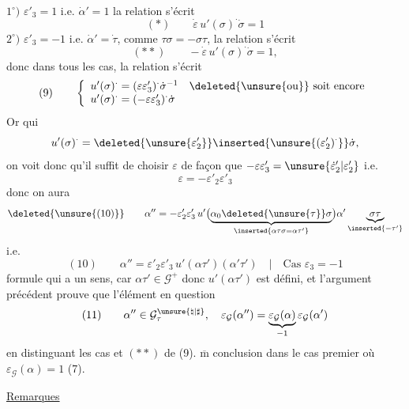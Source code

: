 $1^\circ)$ \quad $\varepsilon'_3=1$ i.e. $\dot{\alpha}'=1$
la relation s'écrit
\[
(*)\qquad \dot{\varepsilon}\,u'(\sigma)^{\cdot}\dot{\sigma}=1
\]
$2^\circ)$ \quad $\varepsilon'_3=-1$ i.e. $\dot{\alpha}'=\dot{\tau}$,
comme $\tau\sigma=-\sigma\tau$, la relation s'écrit
\[
(**)\qquad -\dot{\varepsilon}\,u'(\sigma)^{\cdot}\dot{\sigma}=1,
\]
donc dans tous les cas, la relation s'écrit
\[
(9)\qquad
\left\{
\begin{array}{l}
u'(\sigma)^{\cdot}=(\varepsilon\varepsilon'_3)^{\cdot}
\dot{\sigma}^{-1}
\quad\deleted{\unsure{\text{ou}}}\ \text{soit encore}\\
u'(\sigma)^{\cdot}=(-\varepsilon\varepsilon'_3)^{\cdot}\dot{\sigma}
\end{array}
\right.
\]
Or 
qui 
\[
u'(\sigma)^{\cdot}
=\deleted{\unsure{\varepsilon_2'}}
\inserted{\unsure{(\varepsilon'_2)^{\cdot}}}\dot{\sigma},
\]
on voit donc qu'il suffit de choisir $\varepsilon$ de façon que
$-\varepsilon\varepsilon'_3=\unsure{\dot{\varepsilon}'_2|\varepsilon'_2}$
i.e.
\[
\varepsilon=-\varepsilon'_2\varepsilon'_3
\]
donc on aura
\[
\deleted{\unsure{(10)}}\qquad
\alpha''=-\varepsilon'_2\varepsilon'_3\,
u'\bigl(
\underbrace{\alpha_0\deleted{\unsure{\tau}}\sigma}
_{\inserted{\alpha\tau\sigma=\alpha\tau'}}
\bigr)\alpha'\underbrace{\sigma\tau}_{\inserted{-\tau'}}
\]
i.e.
\[
(10)\qquad
\alpha''=\varepsilon'_2\varepsilon'_3\,u'(\alpha\tau')
(\alpha'\tau')
\quad\big|\quad\text{Cas }\varepsilon_3=-1
\]
formule qui a un sens, car $\alpha\tau'\in\mathcal{G}^{+}$ donc
$u'(\alpha\tau')$ est défini, et l'argument précédent prouve que
l'élément en question 
\[
(11)\qquad
\alpha''\in\mathcal{G}^{\unsure{\natural|\sharp}}_\tau,\quad
\varepsilon_{\mathcal{G}}(\alpha'')
=\underbrace{\varepsilon_{\mathcal{G}}(\alpha)}_{-1}
\varepsilon_{\mathcal{G}}(\alpha')
\]
en distinguant les cas \unsure{(*)} et $(**)$ de (9).
$\overline{\mathrm m}$ conclusion dans le cas premier où
$\varepsilon_{\mathcal{G}}(\alpha)=1$ (7).



\uline{Remarques} 

